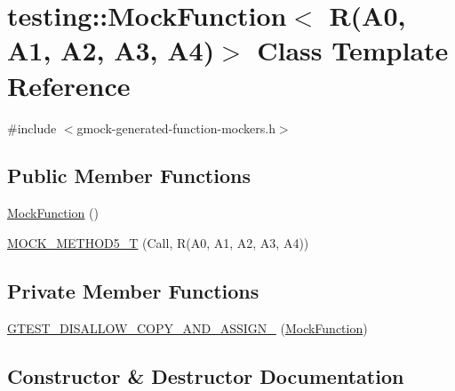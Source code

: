 \hypertarget{classtesting_1_1_mock_function_3_01_r_07_a0_00_01_a1_00_01_a2_00_01_a3_00_01_a4_08_4}{}\section{testing\+::Mock\+Function$<$ R(A0, A1, A2, A3, A4)$>$ Class Template Reference}
\label{classtesting_1_1_mock_function_3_01_r_07_a0_00_01_a1_00_01_a2_00_01_a3_00_01_a4_08_4}


{\ttfamily \#include $<$gmock-\/generated-\/function-\/mockers.\+h$>$}

\subsection*{Public Member Functions}
\begin{DoxyCompactItemize}
\item 
\mbox{\hyperlink{classtesting_1_1_mock_function_3_01_r_07_a0_00_01_a1_00_01_a2_00_01_a3_00_01_a4_08_4_a8f54e305eb5e5cf5f7da836937e159ef}{Mock\+Function}} ()
\item 
\mbox{\hyperlink{classtesting_1_1_mock_function_3_01_r_07_a0_00_01_a1_00_01_a2_00_01_a3_00_01_a4_08_4_a572318905fea75f71338c120f7d1833d}{M\+O\+C\+K\+\_\+\+M\+E\+T\+H\+O\+D5\+\_\+T}} (Call, R(A0, A1, A2, A3, A4))
\end{DoxyCompactItemize}
\subsection*{Private Member Functions}
\begin{DoxyCompactItemize}
\item 
\mbox{\hyperlink{classtesting_1_1_mock_function_3_01_r_07_a0_00_01_a1_00_01_a2_00_01_a3_00_01_a4_08_4_aa38af486d20b1017608703b99987a955}{G\+T\+E\+S\+T\+\_\+\+D\+I\+S\+A\+L\+L\+O\+W\+\_\+\+C\+O\+P\+Y\+\_\+\+A\+N\+D\+\_\+\+A\+S\+S\+I\+G\+N\+\_\+}} (\mbox{\hyperlink{classtesting_1_1_mock_function}{Mock\+Function}})
\end{DoxyCompactItemize}


\subsection{Constructor \& Destructor Documentation}
\mbox{\label{classtesting_1_1_mock_function_3_01_r_07_a0_00_01_a1_00_01_a2_00_01_a3_00_01_a4_08_4_a8f54e305eb5e5cf5f7da836937e159ef}} 
